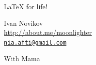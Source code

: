 \documentclass[usenames,dvipsnames,pdftex,unicode,hidelinks]{beamer}
\begin{document}
  \section{}%
  \begin{frame}[plain]
    \begin{center}
      { \Large \LaTeX{} for life! }

      \vspace{1cm}

      Ivan Novikov\\
      \url{http://about.me/moonlighter}\\
      \href{mailto:nia.afti@gmail.com}{\nolinkurl{nia.afti@gmail.com} }
      
      \vspace{1cm}

      With Mama

    \end{center}
  \end{frame}
\end{document}
